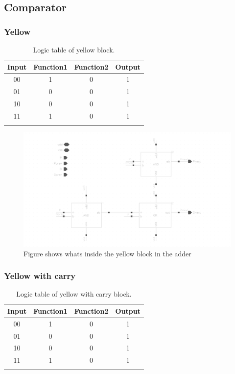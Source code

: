\subsection{Comparator}

\subsubsection{Yellow}

\begin{table}[H]
  \caption{Logic table of yellow block.}
  \centering
  \begin{tabular}{cccc}
    \toprule
    Input & Function1 & Function2 & Output \\
    \midrule
    00 & 1 & 0& 1\\
    01 & 0 & 0 & 1\\
    10 & 0 & 0 & 1\\
    11 & 1 & 0 & 1\\
    \bottomrule
    \label{tab:yellow}
  \end{tabular}
\end{table}

\begin{figure}[H]
  \centering
  \captionsetup{justification=centering}
  \includegraphics[clip,width=1.0\textwidth]{../figures/yellow}
  \caption{Figure shows whats inside the yellow block in the adder} \label{fig:yellow}
\end{figure}

\subsubsection{Yellow with carry}

\begin{table}[H]
  \caption{Logic table of yellow with carry block.}
  \centering
  \begin{tabular}{cccc}
    \toprule
    Input & Function1 & Function2 & Output \\
    \midrule
    00 & 1 & 0& 1\\
    01 & 0 & 0 & 1\\
    10 & 0 & 0 & 1\\
    11 & 1 & 0 & 1\\
    \bottomrule
    \label{tab:yellowcarry}
  \end{tabular}
\end{table}

